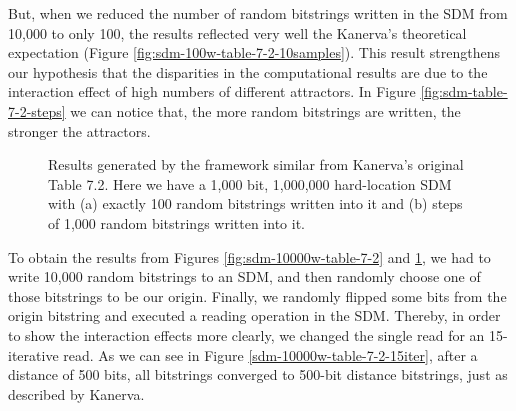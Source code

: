 But, when we reduced the number of random bitstrings written in the SDM from 10,000 to only 100, the results reflected very well the Kanerva's theoretical expectation (Figure \ref{fig:sdm-100w-table-7-2-10samples}). This result strengthens our hypothesis that the disparities in the computational results are due to the interaction effect of high numbers of different attractors. In Figure \ref{fig:sdm-table-7-2-steps} we can notice that, the more random bitstrings are written, the stronger the attractors.

\begin{figure}[h]
\centering
{}

\caption{Results generated by the framework similar from Kanerva's original Table 7.2. Here we have a 1,000 bit, 1,000,000 hard-location SDM with (a) exactly 100 random bitstrings written into it and (b) steps of 1,000 random bitstrings written into it.
\label{fig:sdm-100w-table-7-2}}
\end{figure}

To obtain the results from Figures \ref{fig:sdm-10000w-table-7-2} and \ref{fig:sdm-100w-table-7-2}, we had to write 10,000 random bitstrings to an SDM, and then randomly choose one of those bitstrings to be our origin. Finally, we randomly flipped some bits from the origin bitstring and executed a reading operation in the SDM. Thereby, in order to show the interaction effects more clearly, we changed the single read for an 15-iterative read. As we can see in Figure \ref{sdm-10000w-table-7-2-15iter}, after a distance of 500 bits, all bitstrings converged to 500-bit distance bitstrings, just as described by Kanerva.

